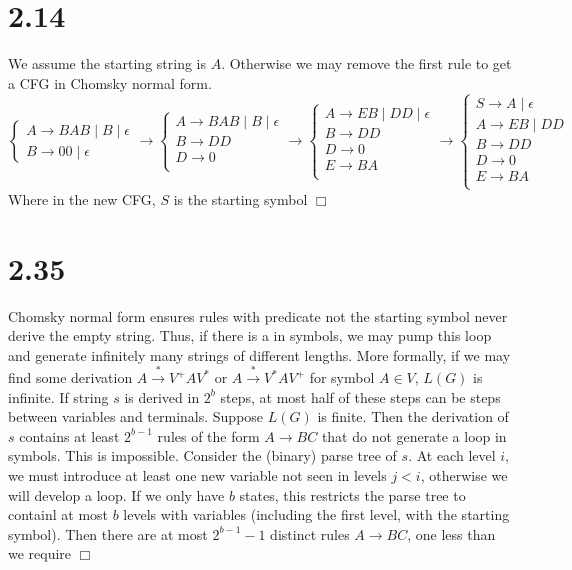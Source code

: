 \documentclass{article}
\begin{document}
\section*{2.14}
We assume the starting string is $A$. Otherwise we may remove the first rule to get a CFG in Chomsky normal form.
\begin{equation*}
\begin{cases}
A \to BAB \;|\; B \;|\; \epsilon\\
B \to 00 \;|\; \epsilon
\end{cases}
\to
\begin{cases}
A \to BAB \;|\; B \;|\; \epsilon\\
B \to DD\\
D \to 0\\
\end{cases}
\to
\begin{cases}
A \to EB \;|\; DD \;|\; \epsilon\\
B \to DD\\
D \to 0\\
E \to BA\\
\end{cases}
\to
\begin{cases}
S \to A \;|\; \epsilon\\
A \to EB \;|\; DD\\
B \to DD\\
D \to 0\\
E \to BA\\
\end{cases}
\end{equation*}
Where in the new CFG, $S$ is the starting symbol $\Box$

\section*{2.35}
Chomsky normal form ensures rules with predicate not the starting symbol never derive the empty string. Thus, if there is a  in symbols, we may pump this loop and generate infinitely many strings of different lengths. More formally, if we may find some derivation $A \overset{*}{\to} V^+AV^*$ or $A \overset{*}{\to} V^*AV^+$ for symbol $A \in V$, $L(G)$ is infinite. If string $s$ is derived in $2^b$ steps, at most half of these steps can be steps between variables and terminals. Suppose $L(G)$ is finite. Then the derivation of $s$ contains at least $2^{b-1}$ rules of the form $A \to BC$ that do not generate a loop in symbols. This is impossible. Consider the (binary) parse tree of $s$. At each level $i$, we must introduce at least one new variable not seen in levels $j < i$, otherwise we will develop a loop. If we only have $b$ states, this restricts the parse tree to containl at most $b$ levels with variables (including the first level, with the starting symbol). Then there are at most $2^{b-1}-1$ distinct rules $A \to BC$, one less than we require $\Box$
\end{document}
